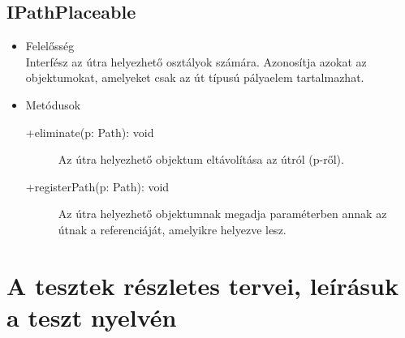 \subsection{IPathPlaceable}
\begin{itemize}
\item Felelősség\\
Interfész az útra helyezhető osztályok számára. Azonosítja azokat az objektumokat, amelyeket csak az út típusú pályaelem tartalmazhat.

\item Metódusok\\
	\begin{description}
		\item[+eliminate(p: Path): void] Az útra helyezhető objektum eltávolítása az útról (p-ről). 
\item[+registerPath(p: Path): void] Az útra helyezhető objektumnak megadja paraméterben annak az útnak a referenciáját, amelyikre helyezve lesz. 

	\end{description}
\end{itemize}

\lstset{escapeinside=`', xleftmargin=10pt, frame=single, basicstyle=\ttfamily\footnotesize, language=sh}


\section{A tesztek részletes tervei, leírásuk a teszt nyelvén}


